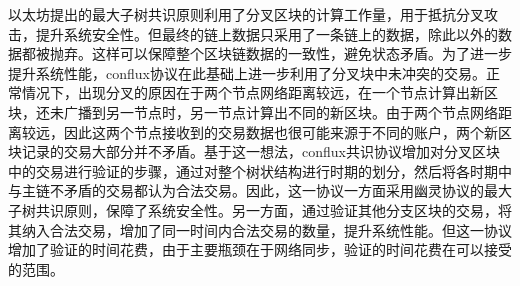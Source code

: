 以太坊提出的最大子树共识原则利用了分叉区块的计算工作量，用于抵抗分叉攻击，提升系统安全性。但最终的链上数据只采用了一条链上的数据，除此以外的数据都被抛弃。这样可以保障整个区块链数据的一致性，避免状态矛盾。为了进一步提升系统性能，conflux协议在此基础上进一步利用了分叉块中未冲突的交易。正常情况下，出现分叉的原因在于两个节点网络距离较远，在一个节点计算出新区块，还未广播到另一节点时，另一节点计算出不同的新区块。由于两个节点网络距离较远，因此这两个节点接收到的交易数据也很可能来源于不同的账户，两个新区块记录的交易大部分并不矛盾。基于这一想法，conflux共识协议增加对分叉区块中的交易进行验证的步骤，通过对整个树状结构进行时期的划分，然后将各时期中与主链不矛盾的交易都认为合法交易。因此，这一协议一方面采用幽灵协议的最大子树共识原则，保障了系统安全性。另一方面，通过验证其他分支区块的交易，将其纳入合法交易，增加了同一时间内合法交易的数量，提升系统性能。但这一协议增加了验证的时间花费，由于主要瓶颈在于网络同步，验证的时间花费在可以接受的范围。


